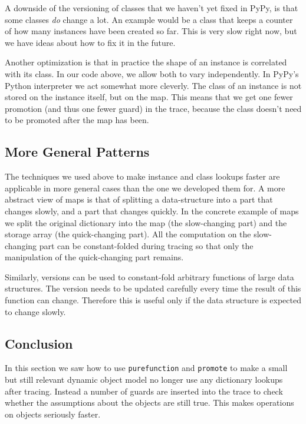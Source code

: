 \documentclass{sigplanconf}
\begin{document}
A downside of the versioning of classes that we haven't yet fixed in PyPy, is
that some classes \emph{do} change a lot. An example would be a class that keeps a
counter of how many instances have been created so far. This is very slow right
now, but we have ideas about how to fix it in the future.

Another optimization is that in practice the shape of an instance is correlated
with its class. In our code above, we allow both to vary independently.
In PyPy's Python interpreter we act somewhat more cleverly. The class of
an instance is not stored on the instance itself, but on the map. This means
that we get one fewer promotion (and thus one fewer guard) in the trace,
because the class doesn't need to
be promoted after the map has been.



\subsection{More General Patterns}

The techniques we used above to make instance and class lookups faster are
applicable in more general cases than the one we developed them for. A more
abstract view of maps is that of splitting a data-structure into a part that
changes slowly, and a part that changes quickly. In the concrete example of maps
we split the original dictionary into the map (the slow-changing part) and the
storage array (the quick-changing part). All the computation on the
slow-changing part can be constant-folded during tracing so that only the
manipulation of the quick-changing part remains.

Similarly, versions can be used to constant-fold arbitrary functions of large data
structures. The version needs to be updated carefully every time the result of
this function can change. Therefore this is useful only if the data structure is
expected to change slowly.



\subsection{Conclusion}

In this section we saw how to use \texttt{purefunction} and \texttt{promote} to make a
small but still relevant dynamic object model no longer use any dictionary lookups
after tracing. Instead a number of guards are inserted into the
trace to check whether the assumptions about the objects are still true. This
makes operations on objects seriously faster.
\end{document}
